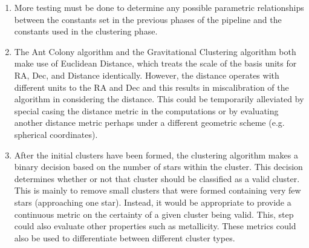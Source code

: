 \begin{enumerate}
    \item More testing must be done to determine any possible parametric relationships between the constants set in the previous phases of the pipeline and the constants used in the clustering phase.
    \item The Ant Colony algorithm and the Gravitational Clustering algorithm
          both make use of Euclidean Distance, which treats the scale of the basis units
          for RA, Dec, and Distance identically. However, the distance operates with
          different units to the RA and Dec and this results in miscalibration of the
          algorithm in considering the distance. This could be temporarily alleviated by
          special casing the distance metric in the computations or by evaluating another
          distance metric perhaps under a different geometric scheme (e.g. spherical
          coordinates).
    \item After the initial clusters have been formed, the clustering algorithm
          makes a binary decision based on the number of stars within the cluster. This
          decision determines whether or not that cluster should be classified as a valid
          cluster. This is mainly to remove small clusters that were formed containing
          very few stars (approaching one star). Instead, it would be appropriate to
          provide a continuous metric on the certainty of a given cluster being valid.
          This, step could also evaluate other properties such as metallicity. These metrics could also be used to differentiate between different cluster types.
\end{enumerate}

